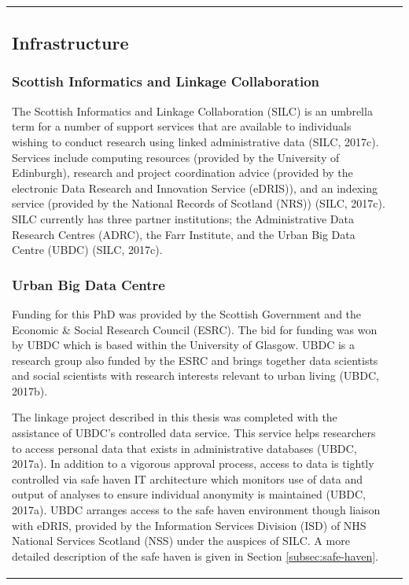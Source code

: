 \documentclass[12pt,a4paper,oneside,table]{report}
\begin{document}
\begin{tabular}[t]{ll}
\subsection{Infrastructure}\label{subsec:infrastructure}

\subsubsection{Scottish Informatics and Linkage Collaboration}\label{subsec:silc}

The Scottish Informatics and Linkage Collaboration (SILC) is an umbrella
term for a number of support services that are available to individuals
wishing to conduct research using linked administrative data (SILC,
2017c). Services include computing resources (provided by the University
of Edinburgh), research and project coordination advice (provided by the
electronic Data Research and Innovation Service (eDRIS)), and an
indexing service (provided by the National Records of Scotland (NRS))
(SILC, 2017c). SILC currently has three partner institutions; the
Administrative Data Research Centres (ADRC), the Farr Institute, and the
Urban Big Data Centre (UBDC) (SILC, 2017c).

\subsubsection{Urban Big Data Centre}\label{subsec:ubdc}

Funding for this PhD was provided by the Scottish Government and the
Economic \& Social Research Council (ESRC). The bid for funding was won
by UBDC which is based within the University of Glasgow. UBDC is a
research group also funded by the ESRC and brings together data
scientists and social scientists with research interests relevant to
urban living (UBDC, 2017b).

The linkage project described in this thesis was completed with the
assistance of UBDC's controlled data service. This service helps
researchers to access personal data that exists in administrative
databases (UBDC, 2017a). In addition to a vigorous approval process,
access to data is tightly controlled via safe haven IT architecture
which monitors use of data and output of analyses to ensure individual
anonymity is maintained (UBDC, 2017a). UBDC arranges access to the safe
haven environment though liaison with eDRIS, provided by the Information
Services Division (ISD) of NHS National Services Scotland (NSS) under
the auspices of SILC. A more detailed description of the safe haven is
given in Section \ref{subsec:safe-haven}.


\end{tabular}
\end{document}
